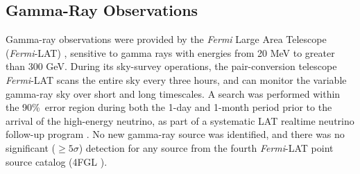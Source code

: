 

\subsection*{Gamma-Ray Observations}

Gamma-ray observations were provided by the %
\textit{Fermi} Large Area Telescope (\textit{Fermi}-LAT) , sensitive to gamma rays with energies from 20 MeV to greater than 300 GeV. During its sky-survey operations, the pair-conversion telescope \textit{Fermi}-LAT scans the entire sky every three hours, and can monitor the variable gamma-ray sky over short and long timescales. A search was performed within the 90\%\ error region during both the 1-day and 1-month period prior to the arrival of the high-energy neutrino, as part of a systematic LAT realtime neutrino follow-up program . No new gamma-ray source was identified, and there was no significant ($\geq 5 \sigma$) detection for any source from the fourth \textit{Fermi}-LAT point source catalog (4FGL ).

